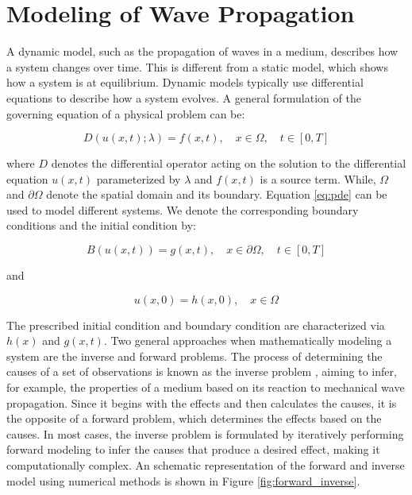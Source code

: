 \documentclass[11pt,twoside]{article}
\begin{document}
\section{Modeling of Wave Propagation}\label{sec:modeling_wave_propagation}

A dynamic model, such as the propagation of waves in a medium, describes how a system changes over time. This is different from a 
static model, which shows how a system is at equilibrium. Dynamic models typically use differential equations to describe how a 
system evolves. A general formulation of the governing equation of a physical problem can be:

\begin{equation*}
D(u(x,t); \lambda) = f(x,t), \quad x \in \Omega, \quad t \in [0, T]\label{eq:pde}
\end{equation*}
 
where $D$ denotes the differential operator acting on the solution to the differential equation $u(x,t)$ parameterized 
by $\lambda$ and $f(x, t)$ is a source term. While, $\Omega$ and $\partial\Omega$ denote the spatial domain and its boundary. 
Equation \ref{eq:pde} can be used to model different systems. We denote the corresponding boundary conditions and the initial 
condition by:

\begin{equation*}
B (u(x, t)) = g(x, t), \quad x \in \partial \Omega, \quad t \in [0, T] 
\end{equation*}

and

\begin{equation*}
u(x, 0) = h(x, 0), \quad x \in \Omega
\end{equation*}

The prescribed initial condition and boundary condition are characterized via $h(x)$ and $g(x, t)$. Two general approaches when 
mathematically modeling a system are the inverse and forward problems. The process of determining the causes 
of a set of observations is known as the inverse problem \citep{Tarantola}, aiming to infer, for example, the properties of a medium 
based on its reaction to mechanical wave propagation. Since it begins with the effects and then calculates the causes, it is the 
opposite of a forward problem, which determines the effects based on the causes. In most cases, the inverse problem is formulated 
by iteratively performing forward modeling to infer the causes that produce a desired effect, making it computationally complex. 
An schematic representation of the forward and inverse model using numerical methods is shown in Figure \ref{fig:forward_inverse}.
\end{document}
